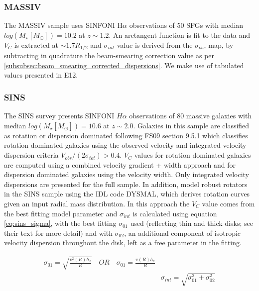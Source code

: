 \documentclass[fleqn,usenatbib]{mn2e}
\begin{document}
\subsubsection{MASSIV}\label{subsubsec:MASSIV}
The MASSIV sample \citep[E12]{Epinat2012} uses SINFONI H$\alpha$ observations of 50 SFGs with median $log(M_{\star}[M_{\odot}])=10.2$ at $z\sim1.2$.
An arctangent function is fit to the data and $V_{C}$ is extracted at $\sim1.7R_{1/2}$ and $\sigma_{int}$ value is derived from the $\sigma_{obs}$ map, by subtracting in quadrature the beam-smearing correction value as per \cref{subsubsec:beam_smearing_corrected_dispersions}.
We make use of tabulated values presented in E12.

\subsubsection{SINS}\label{subsubsec:SINS}
The SINS survey \citep[FS09]{ForsterSchreiber2009} presents SINFONI $H\alpha$ observations of 80 massive galaxies with median $log(M_{\star}[M_{\odot}])=10.6$ at $z\sim2.0$.
Galaxies in this sample are classified as rotation or dispersion dominated following FS09 section 9.5.1 which classifies rotation dominated galaxies using the observed velocity and integrated velocity dispersion criteria $V_{obs}/(2\sigma_{tot}) > 0.4$.
$V_{C}$ values for rotation dominated galaxies are computed using a combined velocity gradient + width approach \citep{ForsterSchreiber2006} and for dispersion dominated galaxies using the velocity width.
Only integrated velocity dispersions are presented for the full sample.
In addition, \cite[C09]{Cresci2009} model robust rotators in the SINS sample using the IDL code DYSMAL, which derives rotation curves given an input radial mass distribution.
In this approach the $V_{C}$ value comes from the best fitting model parameter and $\sigma_{int}$ is calculated using equation \ref{eq:sins_sigma}, with the best fitting $\sigma_{01}$ used (reflecting thin and thick disks; see their text for more detail) and with $\sigma_{02}$, an additional component of isotropic velocity dispersion throughout the disk, left as a free parameter in the fitting.

\begin{equation}\label{eq:sins_sigma}
\begin{split}
\sigma_{01} = \sqrt{\frac{v^{2}(R)h_{z}}{R}} \quad OR \quad \sigma_{01} = \frac{v(R)h_{z}}{R} \\
& \sigma_{int} = \sqrt{\sigma_{01}^{2} + \sigma_{02}^{2}}
\end{split}
\end{equation}
\end{document}
